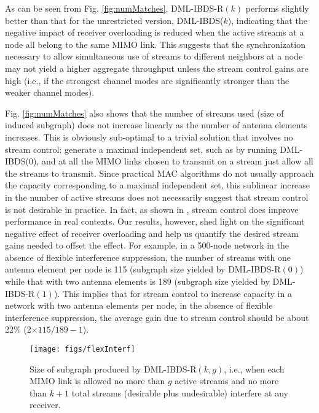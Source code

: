 \documentclass[journal,12pt,onecolumn]{IEEEtran}
\begin{document}
As can be seen from Fig.\,\,\ref{fig:numMatches}, DML-IBDS-R$(k)$ performs
slightly better than that for the unrestricted version, DML-IBDS($k$), indicating
that the negative impact of receiver overloading is reduced when the active streams at a node
all belong to the same MIMO link. This suggests that the synchronization necessary to
allow simultaneous use of streams to different neighbors at a node may
not yield a higher aggregate throughput unless the stream control
gains are high (i.e., if the strongest channel modes are significantly
stronger than the weaker channel modes).

Fig.\,\,\ref{fig:numMatches} also shows that the number of streams used
(size of induced subgraph) does not increase linearly as the number of antenna elements increases. This is
obviously sub-optimal to a trivial solution that involves no stream
control: generate a maximal independent set, such as by running
DML-IBDS(0), and at all the MIMO links chosen to transmit on a 
stream just 
allow all the streams to transmit. Since practical MAC algorithms
do not usually approach the capacity corresponding to a maximal
independent set, this sublinear increase in the number of active
streams does not necessarily suggest that stream control is not
desirable in practice. In fact, as shown in \cite{SunSiv2004}, stream
control does improve performance in real contexts. Our results,
however, shed light on the 
significant negative effect of receiver overloading and help us
quantify the desired stream gains needed to offset the effect. For example,
in a 500-node network in the absence of flexible interference
suppression, the number of streams with one antenna element per node is
115 (subgraph size yielded by DML-IBDS-R$(0)$) while that with two antenna
elements is 189 (subgraph size yielded by DML-IBDS-R$(1)$). This implies  
that for stream control to increase capacity in a network with two
antenna elements per node, in the absence of
flexible interference suppression, the average gain due to stream
control should be about 22\% (2$\times$$115/189 - 1$).

\begin{figure}[!t]
\begin{center}
\texttt{[image: figs/flexInterf]}
\caption{Size of subgraph produced by DML-IBDS-R$(k,g)$, i.e., when
  each MIMO link is allowed no more than $g$ active streams and no
  more than $k+1$ total streams (desirable plus undesirable) interfere
  at any receiver.}
\label{fig:flexInterf}
\end{center}
\end{figure}
\end{document}
